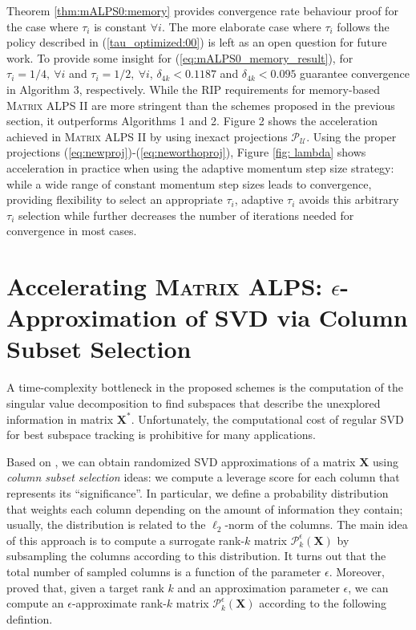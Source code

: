 \documentclass[twocolumn]{svjour3}
\newcommand{\signal}{\boldsymbol{X}}
\newcommand{\bestsignal}{\boldsymbol{X}^\ast}
\newcommand{\rank}{k}
\begin{document}
Theorem \ref{thm:mALPS0:memory} provides convergence rate behaviour proof for the case where $ \tau_i $ is constant $\forall i $. The more elaborate case where $\tau_i$ follows the policy described in (\ref{tau_optimized:00}) is left as an open question for future work. To provide some insight for (\ref{eq:mALPS0_memory_result}), for $\tau_i = 1/4, ~\forall i$ and $\tau_i = 1/2, ~\forall i$, $\delta_{4\rank} < 0.1187 $ and $\delta_{4\rank} < 0.095 $ guarantee convergence in Algorithm 3, respectively. While the RIP requirements for memory-based \textsc{Matrix ALPS II} are more stringent than the schemes proposed in the previous section, it outperforms Algorithms 1 and 2. Figure 2 shows the acceleration achieved in \textsc{Matrix ALPS II} by using inexact projections $\mathcal{P}_{\mathcal{U}}$. Using the proper projections (\ref{eq:newproj})-(\ref{eq:neworthoproj}), Figure \ref{fig: lambda} shows acceleration in practice when using the adaptive momentum step size strategy: while a wide range of constant momentum step sizes leads to convergence, providing flexibility to select an appropriate $\tau_i$, adaptive $\tau_i$ avoids this arbitrary $\tau_i$ selection while further decreases the number of iterations needed for convergence in most cases.  

\section{Accelerating \textsc{Matrix ALPS}: $ \epsilon $-Approximation of SVD via Column Subset Selection}{\label{section:approximate}}

A time-complexity bottleneck in the proposed schemes is the computation of the singular value decomposition to find subspaces that  describe the unexplored information in matrix $\bestsignal $. Unfortunately, the computational cost of regular SVD for best subspace tracking is prohibitive for many applications. 

Based on \cite{drineas1, drineas2},  we can obtain randomized SVD approximations of a matrix $\signal $ using {\it column subset selection} ideas: we compute a leverage score for each column that represents its ``significance''. In particular, we define a probability distribution that weights each column depending on the amount of information they contain; usually, the distribution is related to the $\ell_2$-norm of the columns. The main idea of this approach is to compute a surrogate rank-$\rank$ matrix $\mathcal{P}_{\rank}^{\epsilon}(\signal) $ by subsampling the columns according to this distribution. It turns out that the total number of sampled columns is a function of the parameter $\epsilon$.  Moreover, \cite{deshpande1, deshpande2} proved that, given a target rank $\rank$ and an approximation parameter $\epsilon$, we can compute an $\epsilon$-approximate rank-$\rank$ matrix $\mathcal{P}_{\rank}^\epsilon(\signal) $ according to the following defintion.
\end{document}
